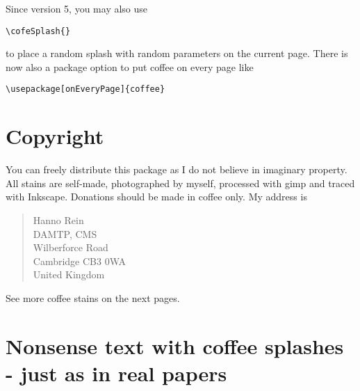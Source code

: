 \documentclass{article}
\begin{document}
\medskip
Since version 5, you may also use
\begin{verbatim}
\cofeSplash{}
\end{verbatim}
to place a random splash with random parameters on the current
page. There is now also a package option to put coffee on every page like
\begin{verbatim}
\usepackage[onEveryPage]{coffee}
\end{verbatim}


\section{Copyright}
You can freely distribute this package as I do not believe in imaginary property. All stains are self-made, photographed by myself, processed with gimp and traced with Inkscape.
Donations should be made in coffee only. My address is
\begin{quote}
Hanno Rein\\
DAMTP, CMS\\
Wilberforce Road\\
Cambridge CB3 0WA\\
United Kingdom
\end{quote}
See more coffee stains on the next pages.
\newpage
\section{Nonsense text with coffee splashes - just as in real papers}
\lipsum[1-42]
\end{document}
